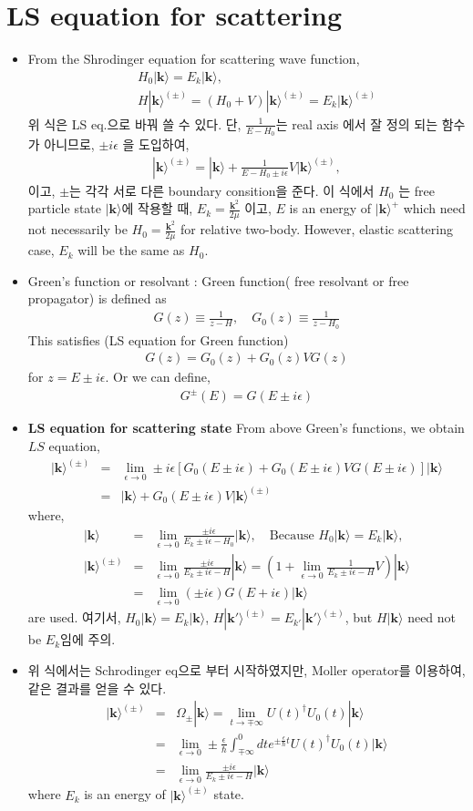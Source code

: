 \documentclass[10pt]{article}
\def\bm{\boldsymbol}
\newcommand{\bea}{\begin{eqnarray}}
\newcommand{\eea}{\end{eqnarray}}
\newcommand{\no}{\nonumber \\}
\def\vk{{\bm k}}
\def\ra{\rangle}
\begin{document}
\section{LS equation for scattering}
\begin{itemize}
\item
From the Shrodinger equation for scattering wave function,
\bea
& &H_0|\vk\ra=E_k|\vk\ra,\no
& &H|\vk\ra^{(\pm)}=(H_0+V)|\vk\ra^{(\pm)} = E_k |\vk\ra^{(\pm)}
\eea
위 식은 LS eq.으로 바꿔 쓸 수 있다. 단, $\frac{1}{E-H_0}$는 
real axis 에서 잘 정의 되는 함수가 아니므로, $\pm i\epsilon$
을 도입하여,
\bea
\boxed{
|\vk\ra^{(\pm)}=|\vk\ra+\frac{1}{E-H_0\pm i\epsilon}V|\vk\ra^{(\pm)},}
\eea
이고, $\pm$는 각각 서로 다른 boundary consition을 준다.
이 식에서  
$H_0$ 는 free particle state $|\vk\ra$에 작용할 때,  $E_k=\frac{\vk^2}{2\mu}$ 이고, 
$E$ is an energy of $|\vk\ra^+$ which 
need not necessarily  be $H_0=\frac{\vk^2}{2\mu}$ 
for relative two-body. However, elastic scattering case, $E_k$ will be the same as $H_0$.

\item Green's function or resolvant : Green function( free resolvant or free propagator) is defined as
\bea
G(z)\equiv\frac{1}{z-H},\quad
G_0(z)\equiv\frac{1}{z-H_0}
\eea
This satisfies (LS equation for Green function) 
\bea
G(z)=G_0(z)+G_0(z)VG(z)
\eea
for $z=E\pm i\epsilon$. Or we can define,
\bea
G^{\pm}(E)=G(E\pm i\epsilon)
\eea
\item {\bf LS equation for scattering state} From above Green's functions,  we obtain $LS$ equation,
\bea
|\vk\ra^{(\pm)}&=&\lim_{\epsilon\to 0} 
       \pm i\epsilon[G_0(E\pm i\epsilon)
                             +G_0(E\pm i\epsilon)V G(E\pm i\epsilon)]|\vk\ra\no 
       &=&|\vk\ra+G_0(E\pm i\epsilon)V|\vk\ra^{(\pm)}
\eea
where, 
\bea
|\vk\ra&=&\lim_{\epsilon\to 0}\frac{\pm i\epsilon}{E_k\pm i\epsilon-H_0}|\vk\ra ,\quad \mbox{Because $H_0|\vk\ra=E_k|\vk\ra$,}\no 
|\vk\ra^{(\pm)}&=&\lim_{\epsilon\to 0}\frac{\pm i\epsilon}{E_k\pm i\epsilon-H}|\vk\ra=(1+\lim_{\epsilon\to 0}\frac{1}{E_k\pm i\epsilon-H} V)|\vk\ra\no
   &=&\lim_{\epsilon\to 0} (\pm i\epsilon) G(E+i\epsilon)|\vk\ra
\eea
are used. 여기서, 
$H_0|\vk\ra=E_k|\vk\ra$, $H|\vk'\ra^{(\pm)}=E_{k'}|\vk'\ra^{(\pm)}$, but 
$H|\vk\ra$ need not be $E_k$임에 주의.


\item 
위 식에서는 Schrodinger eq으로 부터 시작하였지만, 
Moller operator를 이용하여, 같은 결과를 얻을 수 있다.
\bea
|\vk\ra^{(\pm)}&=&\Omega_{\pm}|\vk\ra
       =\lim_{t\to \mp\infty} U(t)^\dagger U_0(t)|\vk\ra\no 
       &=&\lim_{\epsilon\to 0}\pm\frac{\epsilon}{\hbar}
       \int^0_{\mp\infty} dt
       e^{\pm\frac{\epsilon}{\hbar}t}U(t)^\dagger U_0(t)|\vk\ra\no 
      &=&\lim_{\epsilon\to 0}\frac{\pm i\epsilon}{E_k\pm i\epsilon-H}|\vk\ra
\eea
where $E_k$ is an energy of $|\vk\ra^{(\pm)}$ state.


\end{itemize}
\end{document}
